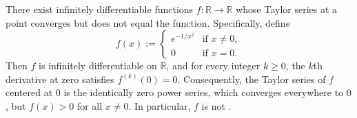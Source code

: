 \begin{theorem} \label{theorem:smooth_function_with_vanishing_taylor_series_not_equal_to_zero}
    There exist infinitely differentiable functions $f : \mathbb{R} \to \mathbb{R}$ whose Taylor series at a point converges but does not equal the function. Specifically, define
    $$f(x) := \begin{cases} e^{-1/x^2} & \text{if } x \neq 0, \\ 0 & \text{if } x = 0. \end{cases}$$
    Then $f$ is infinitely differentiable on $\mathbb{R}$, and for every integer $k \geq 0$, the $k$th derivative at zero satisfies $f^{(k)}(0) = 0$. Consequently, the Taylor series of $f$ centered at $0$ is the identically zero power series, which converges everywhere to $0$, but $f(x) > 0$ for all $x \neq 0$. In particular, $f$ is not .
\end{theorem}

